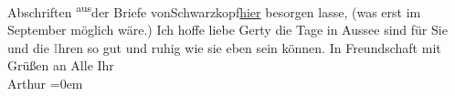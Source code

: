 \begin{ledgroupsized}[t]{13cm}
               Abschriften \substVorne{}\textsuperscript{aus}\substDazwischen{}der Briefe von\substHinten{}{ }Schwarzkopf\uline{hier} besorgen lasse, (was erst im
                  September möglich wäre.)\pend
           \pstart
           Ich hoffe liebe Gerty die Tage in Aussee sind für
               Sie und die \textcolor{gray}{I}hren so gut und ruhig wie sie eben sein können. In
               Freundschaft mit Grüßen an Alle\pend
           \pstart
           Ihr{\\[\baselineskip]}\spacefill\mbox{Arthur}\pend
           \leftskip=0em{}          \endnumbering{}\end{ledgroupsized}  \newcommand{\dateiname}{L02516}\newcommand{\titel}{Arthur Schnitzler an Gerty von Hofmannsthal, 2. 8. 1929}\newcommand{\editorInnen}{Martin Anton Müller und Gerd-Hermann Susen}
      